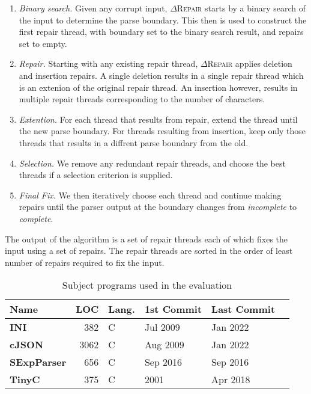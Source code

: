 \documentclass[acmsmall,screen,review,anonymous]{acmart}
\newcommand{\approach}{\textsc{$\Delta$Repair}\xspace}
\newcommand{\drepair}{\approach}
\begin{document}
\begin{enumerate}
\item \emph{Binary search.} Given any corrupt input, \drepair starts by a
binary search of the input to determine the parse boundary. This then is used
to construct the first repair thread, with boundary set to the binary search
result, and repairs set to empty.

\item \emph{Repair.} Starting with any existing repair thread, \drepair applies
deletion and insertion repairs. A single deletion results in a single repair
thread which is an extenion of the original repair thread.
An insertion however, results in multiple repair threads corresponding to the
number of characters.
\item \emph{Extention.} For each thread that results from repair, extend the thread
until the new parse boundary. For threads resulting from insertion, keep only
those threads that results in a diffrent parse boundary from the old.
\item \emph{Selection.} We remove any redundant repair threads, and choose the best threads if a
selection criterion is supplied.

\item \emph{Final Fix.} We then iteratively choose each thread and continue making repairs
until the parser output at the boundary changes from \emph{incomplete} to
\emph{complete}.
\end{enumerate}

The output of the algorithm is a set of repair threads each of which fixes the
input using a set of repairs. The repair threads are sorted in the order of
least number of repairs required to fix the input.






\begin{table}[!tbp]\centering
\caption{Subject programs used in the evaluation}
\begin{tabular}{|l | r | l | l | l | l |}
\hline
\textbf{Name} & \textbf{LOC} & \textbf{Lang.} & \textbf{1{st} Commit} & \textbf{Last Commit} \\
\hline
\textbf{INI} & 382 & C & Jul 2009 & Jan 2022\\
\textbf{cJSON} & 3062 & C & Aug 2009 & Jan 2022\\
\textbf{SExpParser} & 656 & C & Sep 2016 & Sep 2016\\
\textbf{TinyC} & 375 & C & 2001 & Apr 2018\\
\hline
\end{tabular}
\label{tab:subject-programs}
\end{table}
\end{document}
